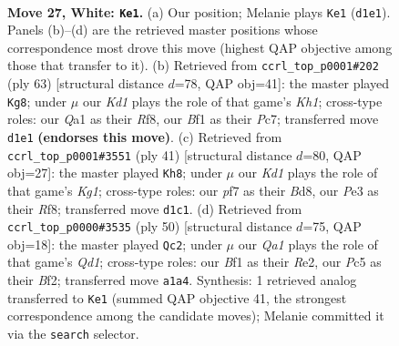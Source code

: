 \documentclass[11pt]{article}
\begin{document}
\clearpage

\begin{figure}[p]\centering
\begin{subfigure}{0.46\textwidth}\centering
\resizebox{\linewidth}{!}{%
\newchessgame
\chessboard[
  setfen={r2rn1k1/p1p2p2/6p1/2Pp1q1p/5P2/1P2P1P1/3BR2P/Q2K1BR1 w - - 0 27},
  showmover=false,
  pgfstyle=straightmove, color=movearrow, markmove={d1-e1}
]}
\caption{}
\end{subfigure}\hfill
\begin{subfigure}{0.46\textwidth}\centering
\resizebox{\linewidth}{!}{%
\newchessgame
\chessboard[
  setfen={5r1k/2pq1rbp/pp6/3Ppp2/P1P5/1PNQ2P1/5R1P/5R1K b - - 0 32},
  showmover=false,
  pgfstyle=straightmove, color=movearrow, markmove={h8-g8}
]}
\caption{}
\end{subfigure}
\\[4pt]
\begin{subfigure}{0.46\textwidth}\centering
\resizebox{\linewidth}{!}{%
\newchessgame
\chessboard[
  setfen={r2b1rk1/1pqb1ppp/p7/3pPP2/3N4/6Q1/PKP2BPP/3R3R b - - 0 21},
  showmover=false,
  pgfstyle=straightmove, color=movearrow, markmove={g8-h8}
]}
\caption{}
\end{subfigure}\hfill
\begin{subfigure}{0.46\textwidth}\centering
\resizebox{\linewidth}{!}{%
\newchessgame
\chessboard[
  setfen={r3r1k1/3q1pp1/1p5p/np1pP3/2pP1P2/P1P4P/4RBP1/2RQ2K1 w - - 0 26},
  showmover=false,
  pgfstyle=straightmove, color=movearrow, markmove={d1-c2}
]}
\caption{}
\end{subfigure}
\caption{\textbf{Move 27, White: \texttt{Ke1}.} (a) Our position; Melanie plays \texttt{Ke1} (\texttt{d1e1}). Panels (b)--(d) are the retrieved master positions whose correspondence most drove this move (highest QAP objective among those that transfer to it). (b) Retrieved from \texttt{ccrl\_top\_p0001\#202} (ply 63) [structural distance $d$=78, QAP obj=41]: the master played \texttt{Kg8}; under $\mu$ our \emph{Kd1} plays the role of that game's \emph{Kh1}; cross-type roles: our \emph{Q}a1 as their \emph{R}f8, our \emph{B}f1 as their \emph{P}c7; transferred move \texttt{d1e1} \textbf{(endorses this move)}. (c) Retrieved from \texttt{ccrl\_top\_p0001\#3551} (ply 41) [structural distance $d$=80, QAP obj=27]: the master played \texttt{Kh8}; under $\mu$ our \emph{Kd1} plays the role of that game's \emph{Kg1}; cross-type roles: our \emph{p}f7 as their \emph{B}d8, our \emph{P}e3 as their \emph{R}f8; transferred move \texttt{d1c1}. (d) Retrieved from \texttt{ccrl\_top\_p0000\#3535} (ply 50) [structural distance $d$=75, QAP obj=18]: the master played \texttt{Qc2}; under $\mu$ our \emph{Qa1} plays the role of that game's \emph{Qd1}; cross-type roles: our \emph{B}f1 as their \emph{R}e2, our \emph{P}c5 as their \emph{B}f2; transferred move \texttt{a1a4}. Synthesis: 1 retrieved analog transferred to \texttt{Ke1} (summed QAP objective 41, the strongest correspondence among the candidate moves); Melanie committed it via the \texttt{search} selector.}
\label{fig:thought-m52}
\end{figure}
\end{document}
